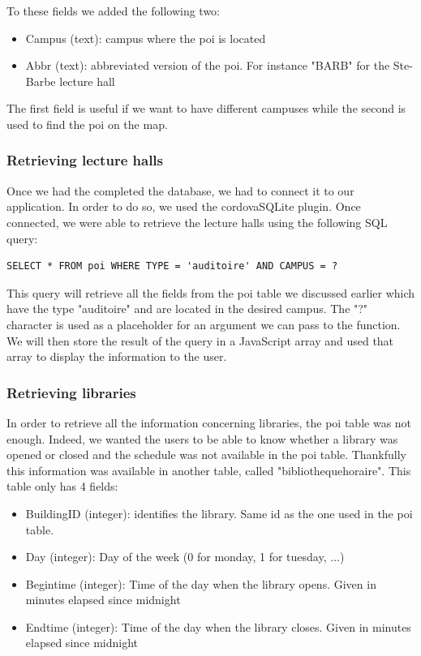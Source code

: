 \documentclass{eplmastersthesis}
\begin{document}
To these fields we added the following two:
\begin{itemize}
\item Campus (text): campus where the poi is located
\item Abbr (text): abbreviated version of the poi. For instance "BARB" for the Ste-Barbe lecture hall
\end{itemize}

The first field is useful if we want to have different campuses while the second is used to find the poi on the map.

\subsubsection{Retrieving lecture halls}

Once we had the completed the database, we had to connect it to our application. In order to do so, we used the cordovaSQLite plugin. Once connected, we were able to retrieve the lecture halls using the following SQL query: 
\begin{verbatim}
SELECT * FROM poi WHERE TYPE = 'auditoire' AND CAMPUS = ?
\end{verbatim}

This query will retrieve all the fields from the poi table we discussed earlier which have the type "auditoire" and are located in the desired campus. The "?" character is used as a placeholder for an argument we can pass to the function. We will then store the result of the query in a JavaScript array and used that array to display the information to the user.

\subsubsection{Retrieving libraries}

In order to retrieve all the information concerning libraries, the poi table was not enough. Indeed, we wanted the users to be able to know whether a library was opened or closed and the schedule was not available in the poi table. Thankfully this information was available in another table, called "bibliotheque\textunderscore horaire". This table only has 4 fields:

\begin{itemize}
\item Building\textunderscore ID (integer): identifies the library. Same id as the one used in the poi table.
\item Day (integer): Day of the week (0 for monday, 1 for tuesday, ...)
\item Begin\textunderscore time (integer): Time of the day when the library opens. Given in minutes elapsed since midnight
\item End\textunderscore time (integer): Time of the day when the library closes. Given in minutes elapsed since midnight
\end{itemize}
\end{document}
